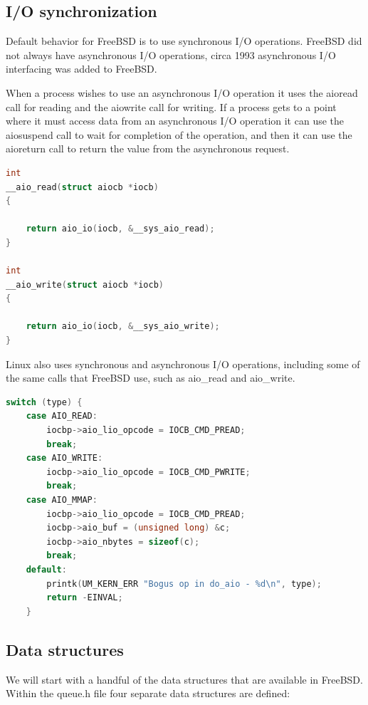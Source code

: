 \documentclass[letterpaper, 10pt, onecolumn, draftclsnofoot]{IEEEtran}
\begin{document}
\subsection{I/O synchronization}
Default behavior for FreeBSD is to use synchronous I/O operations. FreeBSD did not always have asynchronous I/O operations, circa 1993 asynchronous I/O interfacing was added to FreeBSD.\cite{BSD}

When a process wishes to use an asynchronous I/O operation it uses the aio\textunderscore read call for reading and the aio\textunderscore write call for writing. If a process gets to a point where it must access data from an asynchronous I/O operation it can use the aio\textunderscore suspend call to wait for completion of the operation, and then it can use the aio\textunderscore return call to return the value from the asynchronous request.\cite{BSD}

\begin{lstlisting}[language=C]
int
__aio_read(struct aiocb *iocb)
{

	return aio_io(iocb, &__sys_aio_read);
}

int
__aio_write(struct aiocb *iocb)
{

	return aio_io(iocb, &__sys_aio_write);
}
\end{lstlisting}

Linux also uses synchronous and asynchronous I/O operations, including some of the same calls that FreeBSD use, such as aio\_read and aio\_write.\cite{linux}

\begin{lstlisting}[language=C]
	switch (type) {
	case AIO_READ:
		iocbp->aio_lio_opcode = IOCB_CMD_PREAD;
		break;
	case AIO_WRITE:
		iocbp->aio_lio_opcode = IOCB_CMD_PWRITE;
		break;
	case AIO_MMAP:
		iocbp->aio_lio_opcode = IOCB_CMD_PREAD;
		iocbp->aio_buf = (unsigned long) &c;
		iocbp->aio_nbytes = sizeof(c);
		break;
	default:
		printk(UM_KERN_ERR "Bogus op in do_aio - %d\n", type);
		return -EINVAL;
	}
\end{lstlisting}

\subsection{Data structures}
We will start with a handful of the data structures that are available in FreeBSD. Within the queue.h file four separate data structures are defined:
\end{document}
